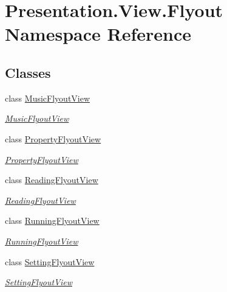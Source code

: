 \hypertarget{namespace_presentation_1_1_view_1_1_flyout}{}\section{Presentation.\+View.\+Flyout Namespace Reference}
\label{namespace_presentation_1_1_view_1_1_flyout}
\subsection*{Classes}
\begin{DoxyCompactItemize}
\item 
class \hyperlink{class_presentation_1_1_view_1_1_flyout_1_1_music_flyout_view}{Music\+Flyout\+View}
\begin{DoxyCompactList}\small\item\em \hyperlink{class_presentation_1_1_view_1_1_flyout_1_1_music_flyout_view}{Music\+Flyout\+View} \end{DoxyCompactList}\item 
class \hyperlink{class_presentation_1_1_view_1_1_flyout_1_1_property_flyout_view}{Property\+Flyout\+View}
\begin{DoxyCompactList}\small\item\em \hyperlink{class_presentation_1_1_view_1_1_flyout_1_1_property_flyout_view}{Property\+Flyout\+View} \end{DoxyCompactList}\item 
class \hyperlink{class_presentation_1_1_view_1_1_flyout_1_1_reading_flyout_view}{Reading\+Flyout\+View}
\begin{DoxyCompactList}\small\item\em \hyperlink{class_presentation_1_1_view_1_1_flyout_1_1_reading_flyout_view}{Reading\+Flyout\+View} \end{DoxyCompactList}\item 
class \hyperlink{class_presentation_1_1_view_1_1_flyout_1_1_running_flyout_view}{Running\+Flyout\+View}
\begin{DoxyCompactList}\small\item\em \hyperlink{class_presentation_1_1_view_1_1_flyout_1_1_running_flyout_view}{Running\+Flyout\+View} \end{DoxyCompactList}\item 
class \hyperlink{class_presentation_1_1_view_1_1_flyout_1_1_setting_flyout_view}{Setting\+Flyout\+View}
\begin{DoxyCompactList}\small\item\em \hyperlink{class_presentation_1_1_view_1_1_flyout_1_1_setting_flyout_view}{Setting\+Flyout\+View} \end{DoxyCompactList}\end{DoxyCompactItemize}
